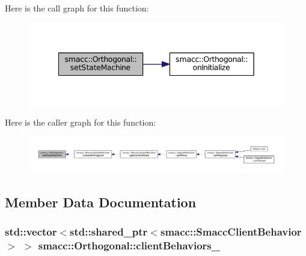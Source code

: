 Here is the call graph for this function\+:
\nopagebreak
\begin{figure}[H]
\begin{center}
\leavevmode
\includegraphics[width=342pt]{classsmacc_1_1Orthogonal_a05f65c01344a6c8593f7f88c0ca19654_cgraph}
\end{center}
\end{figure}




Here is the caller graph for this function\+:
\nopagebreak
\begin{figure}[H]
\begin{center}
\leavevmode
\includegraphics[width=350pt]{classsmacc_1_1Orthogonal_a05f65c01344a6c8593f7f88c0ca19654_icgraph}
\end{center}
\end{figure}




\subsection{Member Data Documentation}
\subsubsection[{\texorpdfstring{client\+Behaviors\+\_\+}{clientBehaviors_}}]{\setlength{\rightskip}{0pt plus 5cm}std\+::vector$<$std\+::shared\+\_\+ptr$<${\bf smacc\+::\+Smacc\+Client\+Behavior}$>$ $>$ smacc\+::\+Orthogonal\+::client\+Behaviors\+\_\+\hspace{0.3cm}{\ttfamily [private]}}\hypertarget{classsmacc_1_1Orthogonal_ad54f97cbc9942e08dee0a0d7ddb86dbd}{}\label{classsmacc_1_1Orthogonal_ad54f97cbc9942e08dee0a0d7ddb86dbd}


